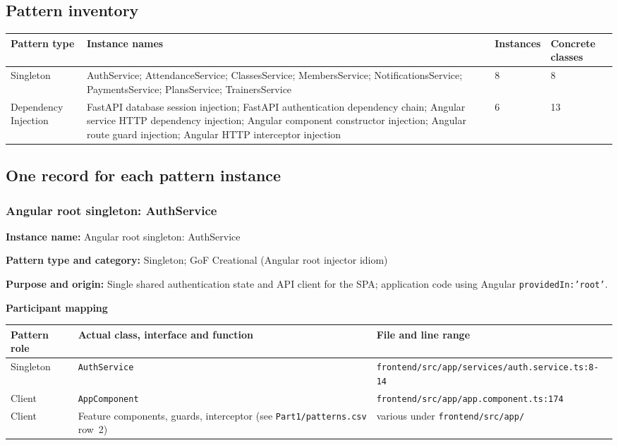 \documentclass[11pt,a4paper]{article}
\newcommand{\fp}[1]{\nolinkurl{#1}}
\newcommand{\filledentry}[2]{\textbf{#1:} #2\par}
\begin{document}
\subsection{Pattern inventory}

\begin{tabularx}{\linewidth}{@{}lXll@{}}
\toprule
Pattern type & Instance names & Instances & Concrete classes\\
\midrule
Singleton &
AuthService; AttendanceService; ClassesService; MembersService; NotificationsService; PaymentsService; PlansService; TrainersService &
8 & 8\\
Dependency Injection &
FastAPI database session injection; FastAPI authentication dependency chain; Angular service HTTP dependency injection; Angular component constructor injection; Angular route guard injection; Angular HTTP interceptor injection &
6 & 13\\
\bottomrule
\end{tabularx}

\subsection{One record for each pattern instance}

\subsubsection{Angular root singleton: AuthService}

\filledentry{Instance name}{Angular root singleton: AuthService}
\filledentry{Pattern type and category}{Singleton; GoF Creational (Angular root injector idiom)}
\filledentry{Purpose and origin}{Single shared authentication state and API client for the SPA; application code using Angular \texttt{providedIn:'root'}.}

\textbf{Participant mapping}\par
\begin{tabularx}{\linewidth}{@{}p{2.4cm}LL@{}}
\toprule
Pattern role & Actual class, interface and function & File and line range\\
\midrule
Singleton & \texttt{AuthService} & \fp{frontend/src/app/services/auth.service.ts:8-14}\\
Client & \texttt{AppComponent} & \fp{frontend/src/app/app.component.ts:174}\\
Client & Feature components, guards, interceptor (see \texttt{Part1/patterns.csv} row~2) & various under \fp{frontend/src/app/}\\
\bottomrule
\end{tabularx}
\end{document}
